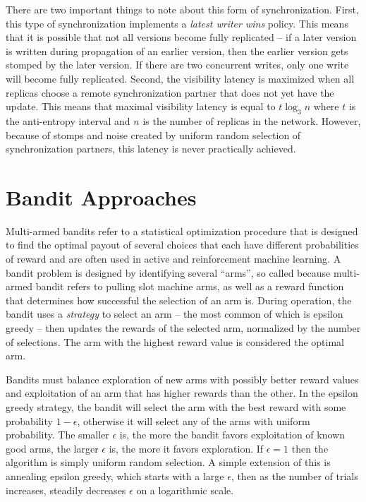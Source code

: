 There are two important things to note about this form of synchronization.
First, this type of synchronization implements a \textit{latest writer wins}
policy.
This means that it is possible that not all versions become fully replicated
-- if a later version is written during propagation of an earlier version,
then the earlier version gets stomped by the later version.
If there are two concurrent writes, only one write will become fully
replicated.
Second, the visibility latency is maximized when all replicas choose a remote
synchronization partner that does not yet have the update.
This means that maximal visibility latency is equal to $t\log_3n$ where
$t$ is the anti-entropy interval and $n$ is the number of replicas in the
network.
However, because of stomps and noise created by uniform random selection of
synchronization partners, this latency is never practically achieved.

\section*{Bandit Approaches}

Multi-armed bandits refer to a statistical optimization procedure that is
designed to find the optimal payout of several choices that each have
different probabilities of reward and are often used in active and
reinforcement machine learning.
A bandit problem is designed by identifying several ``arms'', so called
because multi-armed bandit refers to pulling slot machine arms, as well as a
reward function that determines how successful the selection of an arm is.
During operation, the bandit uses a \textit{strategy} to select an arm -- the
most common of which is epsilon greedy -- then updates the rewards of the
selected arm, normalized by the number of selections.
The arm with the highest reward value is considered the optimal arm.

Bandits must balance exploration of new arms with possibly better reward
values and exploitation of an arm that has higher rewards than the other.
In the epsilon greedy strategy, the bandit will select the arm with the best
reward with some probability $1-\epsilon$, otherwise it will select any of the
arms with uniform probability.
The smaller $\epsilon$ is, the more the bandit favors exploitation of known
good arms, the larger $\epsilon$ is, the more it favors exploration.
If $\epsilon=1$ then the algorithm is simply uniform random selection.
A simple extension of this is annealing epsilon greedy, which starts with a large $\epsilon$, then as the number of trials increases, steadily decreases
$\epsilon$ on a logarithmic scale.

